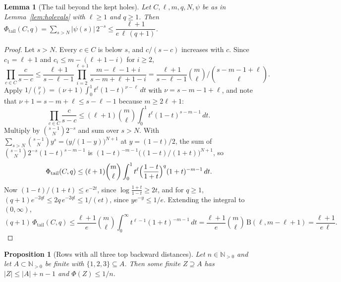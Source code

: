 \documentclass[11pt]{article}
\newtheorem{lemma}[theorem]{Lemma}
\newtheorem{proposition}[theorem]{Proposition}
\newcommand{\N}{\mathbb N}
\begin{document}
\begin{lemma}[The tail beyond the kept holes]\label{lem:holetail}
Let $C,\ell,m,q,N,\psi$ be as in Lemma~\ref{lem:holevals} with $\ell\ge1$
and $q\ge1$.  Then $\Phi_{\mathrm{tail}}(C,q)=\sum_{s>N}|\psi(s)|\,2^{-s}\le\dfrac{\ell+1}{e\,\ell\,(q+1)}$.
\end{lemma}

\begin{proof}
Let $s>N$.  Every $c\in C$ is below $s$, and $c/(s-c)$ increases with $c$.
Since $c_1=\ell+1$ and $c_i\le m-(\ell+1-i)$ for $i\ge2$,
\[
  \prod_{c\in C}\frac c{s-c}
  \le\frac{\ell+1}{s-\ell-1}\prod_{i=2}^{\ell+1}\frac{m-\ell-1+i}{s-m+\ell+1-i}
  =\frac{\ell+1}{s-\ell-1}\binom m\ell\Big/\binom{s-m-1+\ell}\ell .
\]
Apply $1/\binom\nu \ell=(\nu+1)\int_0^1t^\ell(1-t)^{\nu-\ell}\,dt$ with $\nu=s-m-1+\ell$, and
note that $\nu+1=s-m+\ell\le s-\ell-1$ because $m\ge2\ell+1$:
\[
  \prod_{c\in C}\frac c{s-c}\le(\ell+1)\binom m\ell\int_0^1t^\ell(1-t)^{s-m-1}\,dt .
\]
Multiply by $\binom{s-1}N2^{-s}$ and sum over $s>N$.  With
$\sum_{s>N}\binom{s-1}N y^s=\bigl(y/(1-y)\bigr)^{N+1}$ at $y=(1-t)/2$, the
sum of $\binom{s-1}N2^{-s}(1-t)^{s-m-1}$ is
$(1-t)^{-m-1}\bigl((1-t)/(1+t)\bigr)^{N+1}$, so
\[
  \Phi_{\mathrm{tail}}(C,q)\le(\ell+1)\binom m\ell\int_0^1t^\ell
     \Bigl(\frac{1-t}{1+t}\Bigr)^q(1+t)^{-m-1}\,dt .
\]
Now $(1-t)/(1+t)\le e^{-2t}$, since $\log\frac{1+t}{1-t}\ge2t$, and for
$q\ge1$, $(q+1)e^{-2qt}\le2q\,e^{-2qt}\le1/(et)$, since $ye^{-y}\le1/e$.
Extending the integral to $(0,\infty)$,
\[
  (q+1)\,\Phi_{\mathrm{tail}}(C,q)\le\frac{\ell+1}e\binom m\ell\int_0^\infty t^{\ell-1}(1+t)^{-m-1}\,dt
  =\frac{\ell+1}e\binom m\ell\,\mathrm B(\ell,m-\ell+1)=\frac{\ell+1}{e\,\ell}.
\]
\end{proof}

\begin{proposition}[Rows with all three top backward distances]\label{prop:rowstop}
Let $n\in\N_{>0}$ and let $A\subset\N_{>0}$ be finite with $\{1,2,3\}\subseteq A$.
Then some finite $Z\supseteq A$ has $|Z|\le|A|+n-1$ and $\Phi(Z)\le1/n$.
\end{proposition}
\end{document}

